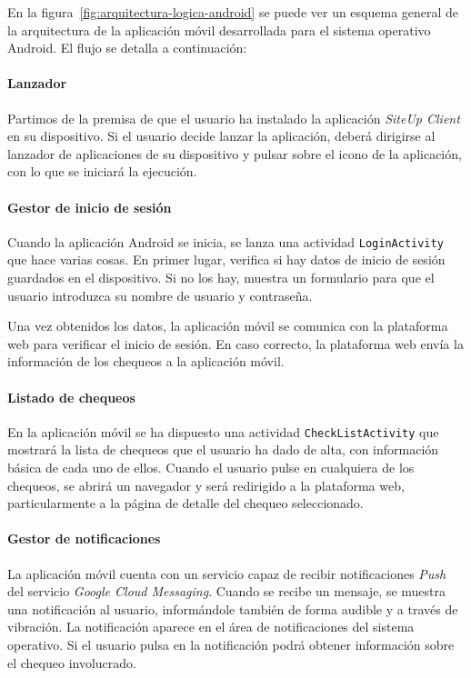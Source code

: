 En la figura~\ref{fig:arquitectura-logica-android} se puede ver un esquema
general de la arquitectura de la aplicación móvil desarrollada para el sistema
operativo Android. El flujo se detalla a continuación:

\paragraph{Lanzador}

Partimos de la premisa de que el usuario ha instalado la aplicación
\textit{SiteUp Client} en su dispositivo. Si el usuario decide lanzar la
aplicación, deberá dirigirse al lanzador de aplicaciones de su dispositivo y
pulsar sobre el icono de la aplicación, con lo que se iniciará la ejecución.

\paragraph{Gestor de inicio de sesión}

Cuando la aplicación Android se inicia, se lanza una actividad
\texttt{LoginActivity} que hace varias cosas. En primer lugar, verifica si hay
datos de inicio de sesión guardados en el dispositivo. Si no los hay, muestra un
formulario para que el usuario introduzca su nombre de usuario y contraseña. 

Una vez obtenidos los datos, la aplicación móvil se comunica con la plataforma
web para verificar el inicio de sesión. En caso correcto, la plataforma web
envía la información de los chequeos a la aplicación móvil.

\paragraph{Listado de chequeos}

En la aplicación móvil se ha dispuesto una actividad \texttt{CheckListActivity}
que mostrará la lista de chequeos que el usuario ha dado de alta, con
información básica de cada uno de ellos. Cuando el usuario pulse en cualquiera
de los chequeos, se abrirá un navegador y será redirigido a la plataforma web,
particularmente a la página de detalle del chequeo seleccionado.

\paragraph{Gestor de notificaciones}

La aplicación móvil cuenta con un servicio capaz de recibir notificaciones
\textit{Push} del servicio \textit{Google Cloud Messaging}. Cuando se recibe un
mensaje, se muestra una notificación al usuario, informándole también de forma
audible y a través de vibración. La notificación aparece en el área de
notificaciones del sistema operativo. Si el usuario pulsa en la notificación
podrá obtener información sobre el chequeo involucrado.

